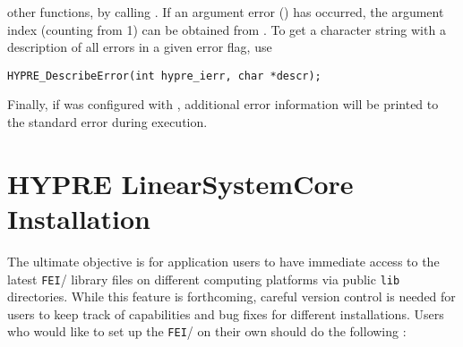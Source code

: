 other \hypre{} functions, by calling .
If an argument error () has occurred, the
argument index (counting from 1) can be obtained
from .
To get a character string with a description of all errors in a
given error flag, use
\begin{display} \begin{verbatim}
HYPRE_DescribeError(int hypre_ierr, char *descr);
\end{verbatim} \end{display}
Finally, if \hypre{} was configured with , additional
error information will be printed to the standard error during execution.


\section{HYPRE LinearSystemCore Installation}
\label{LSI_install}

The ultimate objective is for application users to have immediate access
to the latest {\tt FEI}/\hypre{} library files on different computing platforms
via public {\tt lib} directories.  While this feature is forthcoming, careful 
version control is needed for users to keep track of capabilities and bug fixes 
for different installations.  Users who would like to set up the {\tt FEI}/\hypre{}
on their own should do the following :


